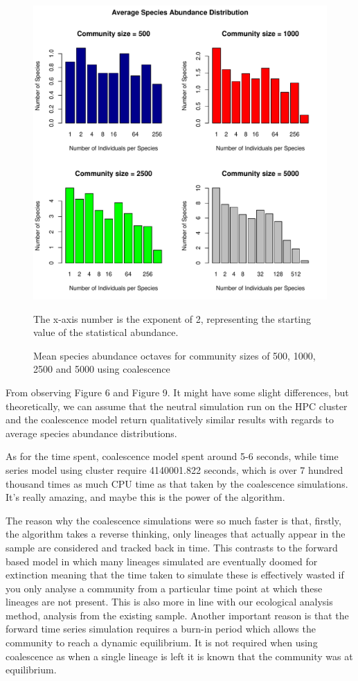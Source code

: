 \documentclass[12pt]{article}
\begin{document}
\begin{figure}[!ht]
\centering 
\includegraphics[width = 0.8\hsize]{../../results/ChallengeD.pdf} 
\caption{Mean species abundance octaves for community sizes of 500, 1000, 2500 and 5000 using coalescence}
The x-axis number is the exponent of 2, representing the starting value of the statistical abundance.
\end{figure}

From observing Figure 6 and Figure 9. It might have some slight differences, but theoretically, we can assume that the neutral simulation run on the HPC cluster and the coalescence model return qualitatively similar results with regards to average species abundance distributions. 

As for the time spent, coalescence model spent around 5-6 seconds, while time series model using cluster require 4140001.822 seconds, which is over 7 hundred thousand times as much CPU time as that taken by the coalescence simulations. It's really amazing, and maybe this is the power of the algorithm.

The reason why the coalescence simulations were so much faster is that, firstly, the algorithm takes a reverse thinking, only lineages that actually appear in the sample are considered and tracked back in time. This contrasts to the forward based model in which many lineages simulated are eventually doomed for extinction meaning that the time taken to simulate these is effectively wasted if you only analyse a community from a particular time point at which these lineages are not present. This is also more in line with our ecological analysis method, analysis from the existing sample. Another important reason is that the forward time series simulation requires a burn-in period which allows the community to reach a dynamic equilibrium. It is not required when using coalescence as when a single lineage is left it is known that the community was at equilibrium.
\end{document}
